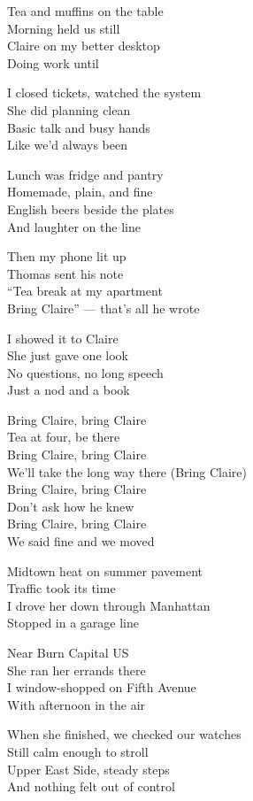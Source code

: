 \begin{lyrics}
Tea and muffins on the table\\
Morning held us still\\
Claire on my better desktop\\
Doing work until

I closed tickets, watched the system\\
She did planning clean\\
Basic talk and busy hands\\
Like we’d always been

Lunch was fridge and pantry\\
Homemade, plain, and fine\\
English beers beside the plates\\
And laughter on the line

Then my phone lit up\\
Thomas sent his note\\
“Tea break at my apartment\\
Bring Claire” — that’s all he wrote

I showed it to Claire\\
She just gave one look\\
No questions, no long speech\\
Just a nod and a book

Bring Claire, bring Claire\\
Tea at four, be there\\
Bring Claire, bring Claire\\
We’ll take the long way there
(Bring Claire)\\
Bring Claire, bring Claire\\
Don’t ask how he knew\\
Bring Claire, bring Claire\\
We said fine and we moved

Midtown heat on summer pavement\\
Traffic took its time\\
I drove her down through Manhattan\\
Stopped in a garage line

Near Burn Capital US\\
She ran her errands there\\
I window-shopped on Fifth Avenue\\
With afternoon in the air

When she finished, we checked our watches\\
Still calm enough to stroll\\
Upper East Side, steady steps\\
And nothing felt out of control


\end{lyrics}
